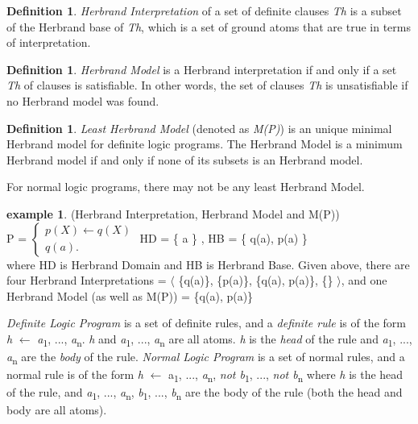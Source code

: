 \documentclass[12pt,twoside]{report}
\theoremstyle{plain}
\theoremstyle{definition}
\newtheorem{defn}[thm]{Definition} %
\newtheorem{examp}{example}[section]
\begin{document}
\begin{defn}
\textit{Herbrand Interpretation} of a set of definite clauses \textit{Th} is a subset of the Herbrand base of \textit{Th}, which is a set of ground atoms that are true in terms of interpretation.
\end{defn}

\begin{defn}
\textit{Herbrand Model} is a Herbrand interpretation if and only if a set \textit{Th} of clauses is satisfiable. In other words, the set of clauses \textit{Th} is unsatisfiable if no Herbrand model was found.
\end{defn}

\begin{defn}
\textit{Least Herbrand Model} (denoted as \textit{M(P)}) is an unique minimal Herbrand model for definite logic programs.  The Herbrand Model is a minimum Herbrand model if and only if none of its subsets is an Herbrand model.
\end{defn}
For normal logic programs, there may not be any least Herbrand Model.


\begin{examp} \normalfont (Herbrand Interpretation, Herbrand Model and M(P)) \\

P = $\begin{cases}
	p(X)  \leftarrow q(X) \\
	q (a).
      \end{cases}$
HD = \{ a \} , HB = \{ q(a), p(a) \}  \\

where HD is Herbrand Domain and HB is Herbrand Base.
Given above,  there are four Herbrand Interpretations = $\langle$ \{q(a)\}, \{p(a)\}, \{q(a), p(a)\}, \{\} $\rangle$, and one Herbrand Model (as well as M(P)) = \{q(a), p(a)\}

\end{examp}

\textit{Definite Logic Program} is a set of definite rules, and  a \textit{definite rule} is of the form \textit{h} $\leftarrow$ \textit{a}\textsubscript{1}, ..., \textit{a}\textsubscript{n}.  \textit{h} and  \textit{a}\textsubscript{1}, ..., \textit{a}\textsubscript{n} are all atoms. \textit{h} is the \textit{head} of the rule and \textit{a}\textsubscript{1}, ..., \textit{a}\textsubscript{n} are the \textit{body} of the rule.
\textit{Normal Logic Program} is a set of normal rules, and a normal rule is of the form \textit{h} $\leftarrow$ a\textsubscript{1}, ..., \textit{a}\textsubscript{n}, \textit{not b}\textsubscript{1}, ..., \textit{not  b}\textsubscript{n} where \textit{h} is the head of the rule,
 and \textit{a}\textsubscript{1}, ..., \textit{a}\textsubscript{n}, \textit{b}\textsubscript{1}, ..., \textit{b}\textsubscript{n} are the body of the rule (both the head and body are all atoms).
\end{document}
